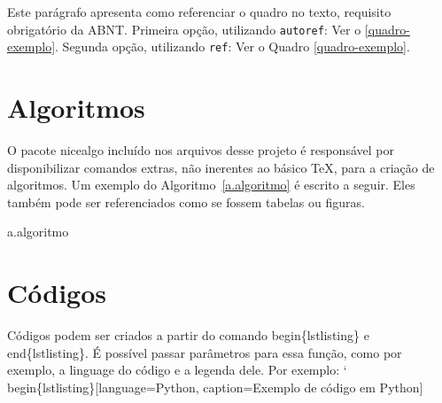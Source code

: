 Este parágrafo apresenta como referenciar o quadro no texto, requisito
obrigatório da ABNT. 
Primeira opção, utilizando \texttt{autoref}: Ver o \autoref{quadro-exemplo}. 
Segunda opção, utilizando  \texttt{ref}: Ver o Quadro \ref{quadro-exemplo}.



\section{Algoritmos}
\label{s.algoritmos}

O pacote nicealgo incluído nos arquivos desse projeto é responsável por disponibilizar comandos extras, não inerentes ao básico TeX, para a criação de algoritmos. Um exemplo do Algoritmo~\ref{a.algoritmo} é escrito a seguir. Eles também pode ser referenciados como se fossem tabelas ou figuras.


\par
{}

\begin{nicealgo}{a.algoritmo}
\naPREAMBLE
{}
\naBODY
{}
\naEND{}
\naEND{}
\naEND{}
\naEND{}
\naEND{}
\end{nicealgo}


\section{Códigos}
\label{s.codigos}

Códigos podem ser criados a partir do comando begin\{lstlisting\} e end\{lstlisting\}. É possível passar parâmetros para essa função, como por exemplo, a linguage do código e a legenda dele. Por exemplo: \char`\\begin\{lstlisting\}[language=Python, caption=Exemplo de código em Python]

